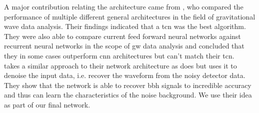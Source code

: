 A major contribution relating the architecture came from \cite{tcn_idea}, who compared the performance of multiple different general architectures in the field of gravitational wave data analysis. Their findings indicated that a \gls{tcn} was the best algorithm. They were also able to compare current feed forward neural networks against recurrent neural networks in the scope of \gls{gw} data analysis and concluded that they in some cases outperform \gls{cnn} architectures but can't match their \gls{tcn}.\\
\cite{dnn_denoising} takes a similar approach to their network architecture as \cite{tcn_idea} does but uses it to denoise the input data, i.e. recover the waveform from the noisy detector data. They show that the network is able to recover \gls{bbh} signals to incredible accuracy and thus can learn the characteristics of the noise background. We use their idea as part of our final network.